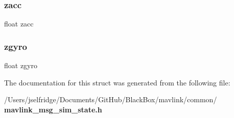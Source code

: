 \subsubsection{zacc}
{\footnotesize\ttfamily float zacc}

\mbox{\label{struct____mavlink__sim__state__t_ae814e88c0e12f476071cc8c9dd95a697}} 
\subsubsection{zgyro}
{\footnotesize\ttfamily float zgyro}



The documentation for this struct was generated from the following file\+:\begin{DoxyCompactItemize}
\item 
/\+Users/jselfridge/\+Documents/\+Git\+Hub/\+Black\+Box/mavlink/common/\textbf{ mavlink\+\_\+msg\+\_\+sim\+\_\+state.\+h}\end{DoxyCompactItemize}
